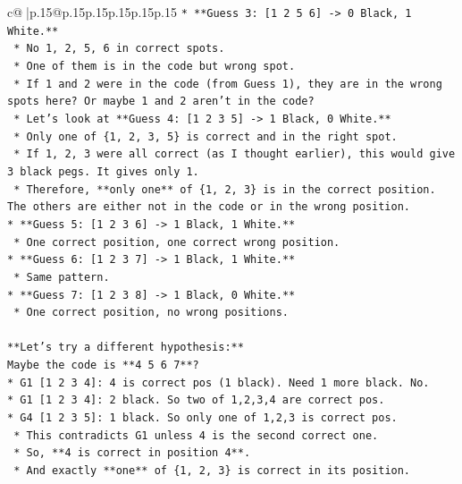 \documentclass{article}
\begin{document}
{\begin{supertabular}{c@{$\;$}|p{.15\linewidth}@{}p{.15\linewidth}p{.15\linewidth}p{.15\linewidth}p{.15\linewidth}p{.15\linewidth}}
{{{\texttt{*   **Guess 3: {[}1 2 5 6{]} {-}> 0 Black, 1 White.**} \\
\texttt{    *   No 1, 2, 5, 6 in correct spots.} \\
\texttt{    *   One of them is in the code but wrong spot.} \\
\texttt{    *   If 1 and 2 were in the code (from Guess 1), they are in the wrong spots here? Or maybe 1 and 2 aren't in the code?} \\
\texttt{    *   Let's look at **Guess 4: {[}1 2 3 5{]} {-}> 1 Black, 0 White.**} \\
\texttt{        *   Only one of \{1, 2, 3, 5\} is correct and in the right spot.} \\
\texttt{        *   If 1, 2, 3 were all correct (as I thought earlier), this would give 3 black pegs. It gives only 1.} \\
\texttt{        *   Therefore, **only one** of \{1, 2, 3\} is in the correct position. The others are either not in the code or in the wrong position.} \\
\texttt{*   **Guess 5: {[}1 2 3 6{]} {-}> 1 Black, 1 White.**} \\
\texttt{    *   One correct position, one correct wrong position.} \\
\texttt{*   **Guess 6: {[}1 2 3 7{]} {-}> 1 Black, 1 White.**} \\
\texttt{    *   Same pattern.} \\
\texttt{*   **Guess 7: {[}1 2 3 8{]} {-}> 1 Black, 0 White.**} \\
\texttt{    *   One correct position, no wrong positions.} \\
\\ 
\texttt{**Let's try a different hypothesis:**} \\
\texttt{Maybe the code is **4 5 6 7**?} \\
\texttt{*   G1 {[}1 2 3 4{]}: 4 is correct pos (1 black). Need 1 more black. No.} \\
\texttt{*   G1 {[}1 2 3 4{]}: 2 black. So two of 1,2,3,4 are correct pos.} \\
\texttt{*   G4 {[}1 2 3 5{]}: 1 black. So only one of 1,2,3 is correct pos.} \\
\texttt{    *   This contradicts G1 unless 4 is the second correct one.} \\
\texttt{    *   So, **4 is correct in position 4**.} \\
\texttt{    *   And exactly **one** of \{1, 2, 3\} is correct in its position.} \\
}}}
\end{supertabular}}
\end{document}
